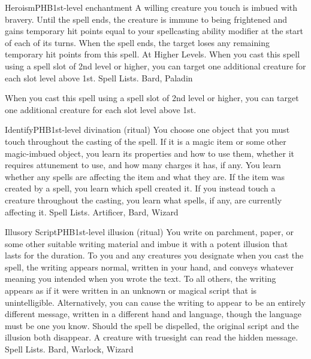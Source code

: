 \begin{spell}{Heroism}{PHB}{1st-level enchantment}
{
}
A willing creature you touch is imbued with bravery. Until the spell ends, the creature is immune to being frightened and gains temporary hit points equal to your spellcasting ability modifier at the start of each of its turns. When the spell ends, the target loses any remaining temporary hit points from this spell.
At Higher Levels. When you cast this spell using a spell slot of 2nd level or higher, you can target one additional creature for each slot level above 1st.
Spell Lists. Bard, Paladin

 When you cast this spell using a spell slot of 2nd level or higher, you can target one additional creature for each slot level above 1st.
\end{spell}

\begin{spell}{Identify}{PHB}{1st-level divination (ritual)}
{
}
You choose one object that you must touch throughout the casting of the spell. If it is a magic item or some other magic-imbued object, you learn its properties and how to use them, whether it requires attunement to use, and how many charges it has, if any. You learn whether any spells are affecting the item and what they are. If the item was created by a spell, you learn which spell created it.
If you instead touch a creature throughout the casting, you learn what spells, if any, are currently affecting it.
Spell Lists. Artificer, Bard, Wizard
\end{spell}

\begin{spell}{Illusory Script}{PHB}{1st-level illusion (ritual)}
{
}
You write on parchment, paper, or some other suitable writing material and imbue it with a potent illusion that lasts for the duration.
To you and any creatures you designate when you cast the spell, the writing appears normal, written in your hand, and conveys whatever meaning you intended when you wrote the text. To all others, the writing appears as if it were written in an unknown or magical script that is unintelligible. Alternatively, you can cause the writing to appear to be an entirely different message, written in a different hand and language, though the language must be one you know.
Should the spell be dispelled, the original script and the illusion both disappear. A creature with truesight can read the hidden message.
Spell Lists. Bard, Warlock, Wizard
\end{spell}

